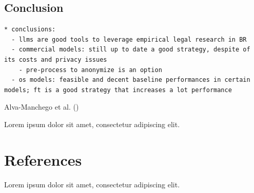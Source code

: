 \documentclass[
  12pt,
  letterpaper,
]{book}
\begin{document}
\section{Conclusion}\label{conclusion}

\begin{verbatim}
* conclusions:
  - llms are good tools to leverage empirical legal research in BR
  - commercial models: still up to date a good strategy, despite of its costs and privacy issues
    - pre-process to anonymize is an option
  - os models: feasible and decent baseline performances in certain models; ft is a good strategy that increases a lot performance
\end{verbatim}

Alva-Manchego et al.
()

Lorem ipsum dolor sit amet, consectetur adipiscing elit.


\chapter{References}\label{references}

Lorem ipsum dolor sit amet, consectetur adipiscing elit.
\end{document}
